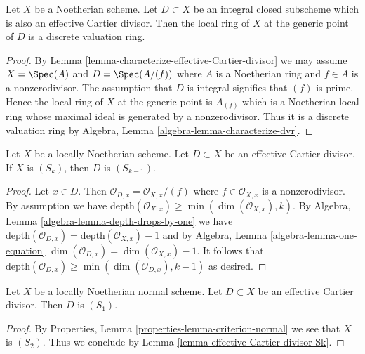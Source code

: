 \begin{lemma}
\label{lemma-integral-effective-Cartier-divisor-dvr}
Let $X$ be a Noetherian scheme. Let $D \subset X$ be an
integral closed subscheme which is also an
effective Cartier divisor. Then the local ring of $X$
at the generic point of $D$ is a discrete valuation ring.
\end{lemma}

\begin{proof}
By Lemma \ref{lemma-characterize-effective-Cartier-divisor}
we may assume $X = \Spec(A)$ and $D = \Spec(A/(f))$
where $A$ is a Noetherian ring and $f \in A$ is a nonzerodivisor.
The assumption that $D$ is integral signifies that $(f)$ is prime.
Hence the local ring of $X$ at the generic point is $A_{(f)}$
which is a Noetherian local ring whose maximal ideal is generated by
a nonzerodivisor. Thus it is a discrete valuation ring by
Algebra, Lemma \ref{algebra-lemma-characterize-dvr}.
\end{proof}

\begin{lemma}
\label{lemma-effective-Cartier-divisor-Sk}
Let $X$ be a locally Noetherian scheme. Let $D \subset X$ be an
effective Cartier divisor. If $X$ is $(S_k)$, then $D$ is $(S_{k - 1})$.
\end{lemma}

\begin{proof}
Let $x \in D$. Then $\mathcal{O}_{D, x} = \mathcal{O}_{X, x}/(f)$ where
$f \in \mathcal{O}_{X, x}$ is a nonzerodivisor. By assumption we have
$\text{depth}(\mathcal{O}_{X, x}) \geq \min(\dim(\mathcal{O}_{X, x}), k)$.
By Algebra, Lemma \ref{algebra-lemma-depth-drops-by-one} we have
$\text{depth}(\mathcal{O}_{D, x}) = \text{depth}(\mathcal{O}_{X, x}) - 1$
and by Algebra, Lemma \ref{algebra-lemma-one-equation}
$\dim(\mathcal{O}_{D, x}) = \dim(\mathcal{O}_{X, x}) - 1$.
It follows that
$\text{depth}(\mathcal{O}_{D, x}) \geq \min(\dim(\mathcal{O}_{D, x}), k - 1)$
as desired.
\end{proof}

\begin{lemma}
\label{lemma-normal-effective-Cartier-divisor-S1}
Let $X$ be a locally Noetherian normal scheme. Let $D \subset X$ be an
effective Cartier divisor. Then $D$ is $(S_1)$.
\end{lemma}

\begin{proof}
By Properties, Lemma \ref{properties-lemma-criterion-normal}
we see that $X$ is $(S_2)$. Thus we conclude by
Lemma \ref{lemma-effective-Cartier-divisor-Sk}.
\end{proof}


